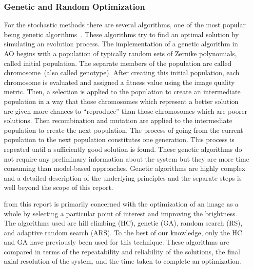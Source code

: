 \subsubsection{Genetic and Random Optimization}
\label{sec:GeneticAndRandomOptimizationMethods}



For the stochastic methods there are several algorithms, one of the most popular being genetic algorithms~\cite{Genetic_tutorial}. These algorithms try to find an optimal solution by simulating an evolution process. The implementation of a genetic algorithm in AO begins with a population of typically random sets of Zernike polynomials, called initial population. The separate members of the population are called chromosome~(also called genotype). After creating this initial population, each chromosome is evaluated and assigned a fitness value using the image quality metric. Then, a selection is applied to the population to create an intermediate population in a way that those chromosomes which represent a better solution are given more chances to ``reproduce'' than those chromosomes which are poorer solutions. Then recombination and mutation are applied to the intermediate population to create the next population. The process of going from the current population to the next population constitutes one generation. This process is repeated until a sufficiently good solution is found. These genetic algorithms do not require any preliminary information about the system but they are more time consuming than model-based approaches. Genetic algorithms are highly complex and a detailed description of the underlying principles and the separate steps is well beyond the scope of this report. 


from \cite{Genetic_compared_to_others}\newline
this report is primarily concerned with the optimization of an image as a whole by selecting a particular point of interest and improving the brightness. The algorithms used are hill climbing (HC), genetic (GA), random search (RS), and adaptive random search (ARS). To the best of our knowledge, only the HC and GA have previously been used for this technique. These algorithms are compared in terms of the repeatability and reliability of the solutions, the final axial resolution of the system, and the time taken to complete an optimization.

